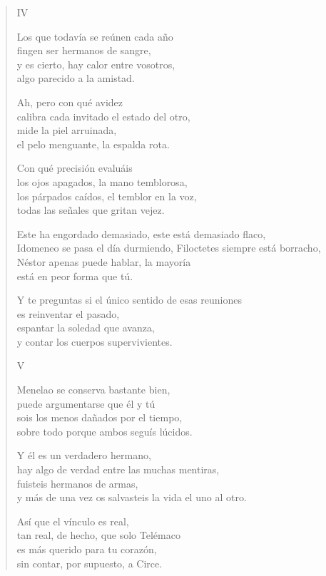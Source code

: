 \documentclass[11pt,a4paper]{article}
\begin{document}
\begin{verse}
IV

Los que todavía se reúnen cada año\\
fingen ser hermanos de sangre,\\
y es cierto, hay calor entre vosotros,\\
algo parecido a la amistad.

Ah, pero con qué avidez\\
calibra cada invitado el estado del otro,\\
mide la piel arruinada,\\
el pelo menguante, la espalda rota.

Con qué precisión evaluáis\\
los ojos apagados, la mano temblorosa,\\
los párpados caídos, el temblor en la voz,\\
todas las señales que gritan vejez.

Este ha engordado demasiado, este está demasiado flaco,\\
Idomeneo se pasa el día durmiendo, Filoctetes siempre está borracho,\\
Néstor apenas puede hablar, la mayoría\\
está en peor forma que tú.

Y te preguntas si el único sentido de esas reuniones\\
es reinventar el pasado,\\
espantar la soledad que avanza,\\
y contar los cuerpos supervivientes.

V

Menelao se conserva bastante bien,\\
puede argumentarse que él y tú\\
sois los menos dañados por el tiempo,\\
sobre todo porque ambos seguís lúcidos.

Y él es un verdadero hermano,\\
hay algo de verdad entre las muchas mentiras,\\
fuisteis hermanos de armas,\\
y más de una vez os salvasteis la vida el uno al otro.

Así que el vínculo es real,\\
tan real, de hecho, que solo Telémaco\\
es más querido para tu corazón,\\
sin contar, por supuesto, a Circe.


\end{verse}
\end{document}
